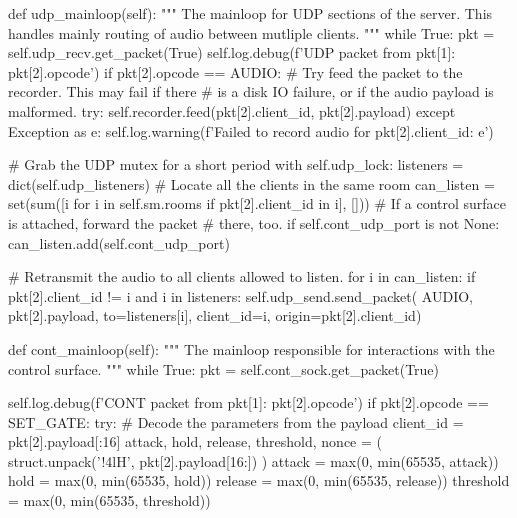 \begin{pythoncode}
    def udp_mainloop(self):
        """
        The mainloop for UDP sections of the server. This handles mainly
        routing of audio between mutliple clients.
        """
        while True:
            pkt = self.udp_recv.get_packet(True)
            self.log.debug(f'UDP packet from {pkt[1]}: {pkt[2].opcode}')
            if pkt[2].opcode == AUDIO:
                # Try feed the packet to the recorder. This may fail if there
                # is a disk IO failure, or if the audio payload is malformed.
                try:
                    self.recorder.feed(pkt[2].client_id, pkt[2].payload)
                except Exception as e:
                    self.log.warning(f'Failed to record audio for {pkt[2].client_id}: {e}')

                # Grab the UDP mutex for a short period
                with self.udp_lock:
                    listeners = dict(self.udp_listeners)
                    # Locate all the clients in the same room
                    can_listen = set(sum([i for i in self.sm.rooms
                                          if pkt[2].client_id in i], []))
                    # If a control surface is attached, forward the packet
                    # there, too.
                    if self.cont_udp_port is not None:
                        can_listen.add(self.cont_udp_port)

                    # Retransmit the audio to all clients allowed to listen.
                    for i in can_listen:
                        if pkt[2].client_id != i and i in listeners:
                            self.udp_send.send_packet(
                                AUDIO, pkt[2].payload, to=listeners[i],
                                client_id=i, origin=pkt[2].client_id)

    def cont_mainloop(self):
        """
        The mainloop responsible for interactions with the control surface.
        """
        while True:
            pkt = self.cont_sock.get_packet(True)

            self.log.debug(f'CONT packet from {pkt[1]}: {pkt[2].opcode}')
            if pkt[2].opcode == SET_GATE:
                try:
                    # Decode the parameters from the payload
                    client_id = pkt[2].payload[:16]
                    attack, hold, release, threshold, nonce = (
                        struct.unpack('!4lH', pkt[2].payload[16:])
                    )
                    attack = max(0, min(65535, attack))
                    hold = max(0, min(65535, hold))
                    release = max(0, min(65535, release))
                    threshold = max(0, min(65535, threshold))


\end{pythoncode}
